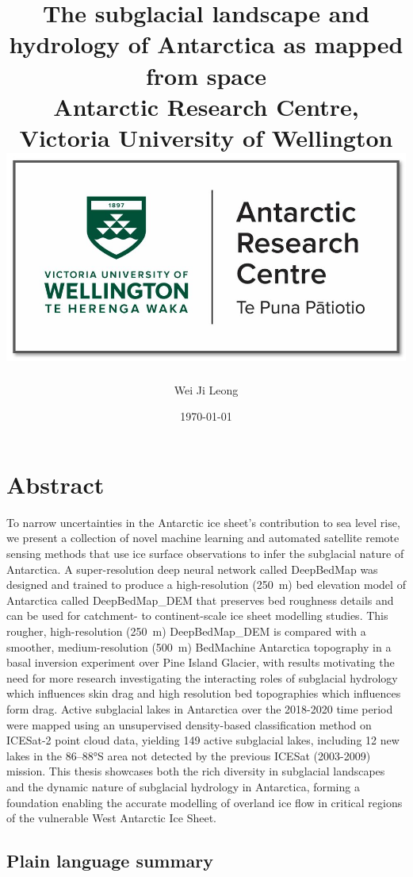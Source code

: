 \documentclass[12pt,twoside]{book}
\title{
{The subglacial landscape and hydrology of Antarctica as mapped from space}\\
{\large Antarctic Research Centre, Victoria University of Wellington}\\
{\includegraphics[scale=0.5]{0_arc_logo.jpg}}
}
\author{Wei Ji Leong}
\date{\today}
\begin{document}


\chapter*{Abstract}

To narrow uncertainties in the Antarctic ice sheet's contribution to sea level rise, we present a collection of novel machine learning and automated satellite remote sensing methods that use ice surface observations to infer the subglacial nature of Antarctica.
A super-resolution deep neural network called DeepBedMap was designed and trained to produce a high-resolution (\SI{250}{\metre}) bed elevation model of Antarctica called DeepBedMap\_DEM that preserves bed roughness details and can be used for catchment- to continent-scale ice sheet modelling studies.
This rougher, high-resolution (\SI{250}{\metre}) DeepBedMap\_DEM is compared with a smoother, medium-resolution (\SI{500}{\metre}) BedMachine Antarctica topography in a basal inversion experiment over Pine Island Glacier, with results motivating the need for more research investigating the interacting roles of subglacial hydrology which influences skin drag and high resolution bed topographies which influences form drag.
Active subglacial lakes in Antarctica over the 2018-2020 time period were mapped using an unsupervised density-based classification method on ICESat-2 point cloud data, yielding 149 active subglacial lakes, including 12 new lakes in the 86--88°S area not detected by the previous ICESat (2003-2009) mission.
This thesis showcases both the rich diversity in subglacial landscapes and the dynamic nature of subglacial hydrology in Antarctica, forming a foundation enabling the accurate modelling of overland ice flow in critical regions of the vulnerable West Antarctic Ice Sheet.


\section*{Plain language summary}
\end{document}

